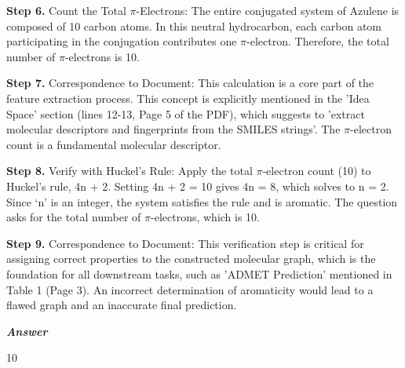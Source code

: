\begin{tcolorbox}[
    breakable,
    title=Example of Scientific Deep Research in Chemistry,
    colback=LighterGray,
    colframe=DeepPurple,
    colbacktitle=DeepPurple,
    coltitle=White,
]
\textbf{\textcolor{CaseOrange}{Step 6.}} Count the Total $\pi$-Electrons: The entire conjugated system of Azulene is composed of 10 carbon atoms. In this neutral hydrocarbon, each carbon atom participating in the conjugation contributes one $\pi$-electron. Therefore, the total number of $\pi$-electrons is 10.

\textbf{\textcolor{CaseOrange}{Step 7.}} Correspondence to Document: This calculation is a core part of the feature extraction process. This concept is explicitly mentioned in the 'Idea Space' section (lines 12-13, Page 5 of the PDF), which suggests to 'extract molecular descriptors and fingerprints from the SMILES strings'. The $\pi$-electron count is a fundamental molecular descriptor.

\textbf{\textcolor{CaseOrange}{Step 8.}} Verify with Huckel's Rule: Apply the total $\pi$-electron count (10) to Huckel's rule, 4n + 2. Setting 4n + 2 = 10 gives 4n = 8, which solves to n = 2. Since ‘n' is an integer, the system satisfies the rule and is aromatic. The question asks for the total number of $\pi$-electrons, which is 10.

\textbf{\textcolor{CaseOrange}{Step 9.}} Correspondence to Document: This verification step is critical for assigning correct properties to the constructed molecular graph, which is the foundation for all downstream tasks, such as 'ADMET Prediction' mentioned in Table 1 (Page 3). An incorrect determination of aromaticity would lead to a flawed graph and an inaccurate final prediction.

\textbf{\emph{\textcolor{DeepPurple}{Answer}}}

10

\end{tcolorbox}


